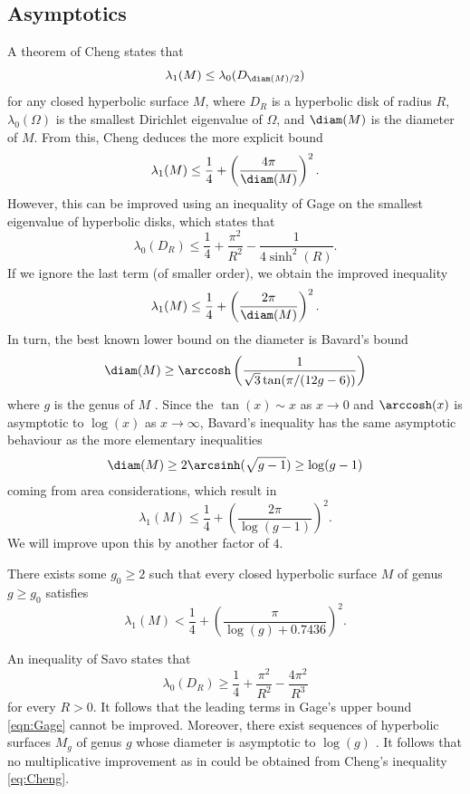 \documentclass[12pt]{amsart}
\numberwithin{equation}{section}
\begin{document}
\subsection{Asymptotics}
A theorem of Cheng \cite[Theorem 2.1]{Cheng} states that
\begin{equation} \label{eq:Cheng}
\lambda_1(M) \leq \lambda_0(D_{\diam(M)/2})
\end{equation}
for any closed hyperbolic surface $M$, where $D_R$ is a hyperbolic disk of radius $R$, $\lambda_0(\Omega)$ is the smallest Dirichlet eigenvalue of $\Omega$, and $\diam(M)$ is the diameter of $M$. From this, Cheng deduces \cite[Corollary 2.3]{Cheng} the more explicit bound
\[
\lambda_1(M) \leq \frac{1}{4}+\left( \frac{4\pi}{\diam(M)}\right)^2.
\]
However, this can be improved using an inequality of Gage \cite[Theorem 5.2(a)]{Gage} on the smallest eigenvalue of hyperbolic disks, which states that
\begin{equation} \label{eqn:Gage}
\lambda_0(D_R) \leq \frac14 + \frac{\pi^2}{R^2} - \frac{1}{4\sinh^2(R)}.
\end{equation}
If we ignore the last term (of smaller order), we obtain the improved inequality
\[
\lambda_1(M) \leq \frac{1}{4}+\left( \frac{2\pi}{\diam(M)}\right)^2.
\]
In turn, the best known lower bound on the diameter is Bavard's bound
\[
\diam(M) \geq \arccosh\left( \frac{1}{\sqrt{3} \tan(\pi / (12g-6))} \right)
\]
where $g$ is the genus of $M$ \cite{Bavard}. Since the $\tan(x)\sim x$ as $x\to 0$ and $\arccosh(x)$ is asymptotic to $\log(x)$ as $x\to \infty$, Bavard's inequality has the same asymptotic behaviour as the more elementary inequalities
\[
\diam(M) \geq 2\arcsinh(\sqrt{g-1}) \geq \log(g-1)
\]
coming from area considerations, which result in
\[
\lambda_1(M) \leq \frac{1}{4}+\left( \frac{2\pi}{\log(g-1)}\right)^2.
\]
We will improve upon this by another factor of $4$.

\begin{thm} \label{thm:lamb_asymp}
There exists some $g_0 \geq 2$ such that every closed hyperbolic surface $M$ of genus $g\geq g_0$ satisfies
\[
\lambda_1(M) < \frac14 + \left(\frac{\pi}{\log(g)+0.7436}\right)^2.
\]
\end{thm}

\begin{rem}
An inequality of Savo \cite[Theorem 5.6]{Savo} states that 
\begin{equation} \label{eqn:Savo}
\lambda_0(D_R) \geq \frac14+ \frac{\pi^2}{R^2}-\frac{4 \pi^2}{R^3}
\end{equation}
for every $R>0$. It follows that the leading terms in Gage's upper bound \eqref{eqn:Gage} cannot be improved. Moreover, there exist sequences of hyperbolic surfaces $M_g$ of genus $g$ whose diameter is asymptotic to $\log(g)$ \cite{diameter}.  It follows that no multiplicative improvement as in  could be obtained from Cheng's inequality \eqref{eq:Cheng}.
\end{rem}
\end{document}
